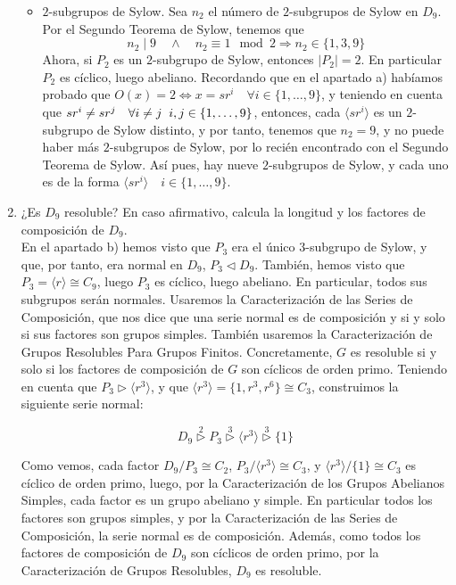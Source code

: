 \documentclass[12pt]{article}
\begin{document}
\begin{ejercicio}[3 puntos]
\begin{enumerate}[label=(\alph*)]
\begin{itemize}
                \item $2$-subgrupos de Sylow. Sea $n_2$ el número de $2$-subgrupos de Sylow en $D_9$. Por el Segundo Teorema de Sylow, tenemos que
                $$n_2 \mid 9 \quad \land \quad n_2 \equiv 1 \mod 2 \Longrightarrow n_2 \in \{1,3,9\}$$
                Ahora, si $P_2$ es un $2$-subgrupo de Sylow, entonces $|P_2| = 2$. En particular $P_2$ es cíclico, luego abeliano. Recordando que en el apartado a) habíamos probado que $O(x) = 2 \iff x = sr^i \quad \forall i \in \{1, \ldots, 9\}$, y teniendo en cuenta que
                $sr^i \neq sr^j \quad \forall i \neq j \hspace{0.2cm} i,j \in \{1, \ldots, 9\}$, entonces, cada $\langle sr^i \rangle$ es un $2$-subgrupo de Sylow distinto, y por tanto, tenemos que $n_2 = 9$, y no puede haber más $2$-subgrupos de Sylow,
                por lo recién encontrado con el Segundo Teorema de Sylow. Así pues, hay nueve $2$-subgrupos de Sylow, y cada uno es de la forma $\langle sr^i \rangle \quad i \in \{1, \ldots, 9\}$. 
            \end{itemize}

            \newpage

            \item ¿Es $D_9$ resoluble? En caso afirmativo, calcula la longitud y los factores de composición de $D_9$. \\

            En el apartado b) hemos visto que $P_3$ era el único $3$-subgrupo de Sylow, y que, por tanto, era normal en $D_9$, $P_3 \vartriangleleft D_9$. También, hemos visto que $P_3 =\langle r \rangle \cong C_9$, luego $P_3$ es cíclico, luego abeliano. En particular, todos sus subgrupos
            serán normales. Usaremos la Caracterización de las Series de Composición, que nos dice que una serie normal es de composición y si y solo si sus factores son grupos simples. También usaremos la Caracterización de Grupos Resolubles Para Grupos Finitos. Concretamente, $G$
            es resoluble si y solo si los factores de composición de $G$ son cíclicos de orden primo. Teniendo en cuenta que $P_3 \vartriangleright \langle r^3 \rangle$, y que $\langle r^3 \rangle = \{1, r^3, r^6\} \cong C_3$, construimos la siguiente serie normal: 

            $$D_9 \stackrel{2}{\vartriangleright} P_3 \stackrel{3}{\vartriangleright} \langle r^3 \rangle \stackrel{3}{\vartriangleright} \{1\}$$

            Como vemos, cada factor $D_9/P_3 \cong C_2$, $P_3/\langle r^3 \rangle \cong C_3$, y $\langle r^3 \rangle / \{1\} \cong C_3$ es cíclico de orden primo, luego, por la Caracterización de los Grupos Abelianos Simples, 
            cada factor es un grupo abeliano y simple. En particular todos los factores son grupos simples, y por la Caracterización de las Series de Composición, la serie normal es de composición. Además, como todos los factores de composición de $D_9$ son cíclicos de orden primo,
            por la Caracterización de Grupos Resolubles, $D_9$ es resoluble. \\


\end{enumerate}
\end{ejercicio}
\end{document}
